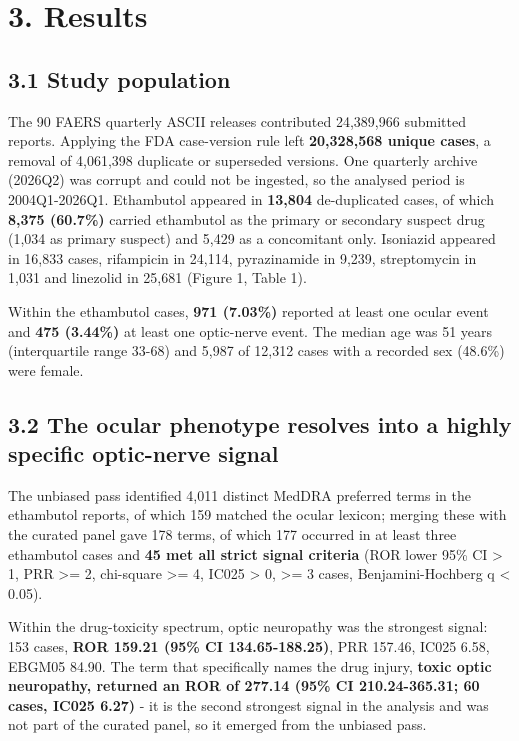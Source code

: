 \documentclass[utf8]{FrontiersinVancouver}
\begin{document}
\section{3. Results}

\subsection{3.1 Study population}

The 90 FAERS quarterly ASCII releases contributed 24,389,966 submitted reports. Applying the FDA case-version rule left \textbf{20,328,568 unique cases}, a removal of 4,061,398 duplicate or superseded versions. One quarterly archive (2026Q2) was corrupt and could not be ingested, so the analysed period is 2004Q1-2026Q1. Ethambutol appeared in \textbf{13,804} de-duplicated cases, of which \textbf{8,375 (60.7\%)} carried ethambutol as the primary or secondary suspect drug (1,034 as primary suspect) and 5,429 as a concomitant only. Isoniazid appeared in 16,833 cases, rifampicin in 24,114, pyrazinamide in 9,239, streptomycin in 1,031 and linezolid in 25,681 (Figure 1, Table 1).

Within the ethambutol cases, \textbf{971 (7.03\%)} reported at least one ocular event and \textbf{475 (3.44\%)} at least one optic-nerve event. The median age was 51 years (interquartile range 33-68) and 5,987 of 12,312 cases with a recorded sex (48.6\%) were female.

\subsection{3.2 The ocular phenotype resolves into a highly specific optic-nerve signal}

The unbiased pass identified 4,011 distinct MedDRA preferred terms in the ethambutol reports, of which 159 matched the ocular lexicon; merging these with the curated panel gave 178 terms, of which 177 occurred in at least three ethambutol cases and \textbf{45 met all strict signal criteria} (ROR lower 95\% CI > 1, PRR >= 2, chi-square >= 4, IC025 > 0, >= 3 cases, Benjamini-Hochberg q < 0.05).

Within the drug-toxicity spectrum, optic neuropathy was the strongest signal: 153 cases, \textbf{ROR 159.21 (95\% CI 134.65-188.25)}, PRR 157.46, IC025 6.58, EBGM05 84.90. The term that specifically names the drug injury, \textbf{toxic optic neuropathy, returned an ROR of 277.14 (95\% CI 210.24-365.31; 60 cases, IC025 6.27)} - it is the second strongest signal in the analysis and was not part of the curated panel, so it emerged from the unbiased pass.
\end{document}
